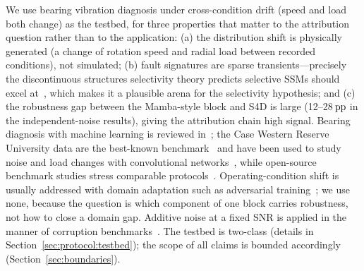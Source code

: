 We use bearing vibration diagnosis under cross-condition drift (speed and load both change) as the testbed, for three properties that matter to the attribution question rather than to the application: (a) the distribution shift is physically generated (a change of rotation speed and radial load between recorded conditions), not simulated; (b) fault signatures are sparse transients---precisely the discontinuous structures selectivity theory predicts selective SSMs should excel at~\cite{huang2025selectivity}, which makes it a plausible arena for the selectivity hypothesis; and (c) the robustness gap between the Mamba-style block and S4D is large (12--28$\,\mathrm{pp}$ in the independent-noise results), giving the attribution chain high signal. Bearing diagnosis with machine learning is reviewed in~\cite{lei2020review,neupane2020cwru}; the Case Western Reserve University data are the best-known benchmark~\cite{smith2015cwru} and have been used to study noise and load changes with convolutional networks~\cite{zhang2017wdcnn}, while open-source benchmark studies stress comparable protocols~\cite{zhao2020benchmark}. Operating-condition shift is usually addressed with domain adaptation such as adversarial training~\cite{ganin2016dann}; we use none, because the question is which component of one block carries robustness, not how to close a domain gap. Additive noise at a fixed SNR is applied in the manner of corruption benchmarks~\cite{hendrycks2019corruptions}. The testbed is two-class (details in Section~\ref{sec:protocol:testbed}); the scope of all claims is bounded accordingly (Section~\ref{sec:boundaries}).
